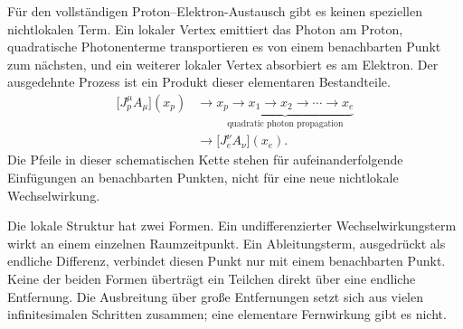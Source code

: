 Für den vollständigen Proton--Elektron-Austausch gibt es keinen speziellen nichtlokalen Term. Ein lokaler Vertex emittiert das Photon am Proton, quadratische Photonenterme transportieren es von einem benachbarten Punkt zum nächsten, und ein weiterer lokaler Vertex absorbiert es am Elektron. Der ausgedehnte Prozess ist ein Produkt dieser elementaren Bestandteile.
\begin{equation}
\begin{aligned}
\bigl[J_p^\mu A_\mu\bigr](x_p)
&\longrightarrow
\underbrace{x_p\to x_1\to x_2\to\cdots\to x_e}_{\text{quadratic photon propagation}}
\\
&\longrightarrow
\bigl[J_e^\nu A_\nu\bigr](x_e).
\end{aligned}
\end{equation}
Die Pfeile in dieser schematischen Kette stehen für aufeinanderfolgende Einfügungen an benachbarten Punkten, nicht für eine neue nichtlokale Wechselwirkung.

\begin{classroomqa}
\end{classroomqa}

Die lokale Struktur hat zwei Formen. Ein undifferenzierter Wechselwirkungsterm wirkt an einem einzelnen Raumzeitpunkt. Ein Ableitungsterm, ausgedrückt als endliche Differenz, verbindet diesen Punkt nur mit einem benachbarten Punkt. Keine der beiden Formen überträgt ein Teilchen direkt über eine endliche Entfernung. Die Ausbreitung über große Entfernungen setzt sich aus vielen infinitesimalen Schritten zusammen; eine elementare Fernwirkung gibt es nicht.

\begin{classroomqa}
\end{classroomqa}

\begin{classroomqa}
\end{classroomqa}

